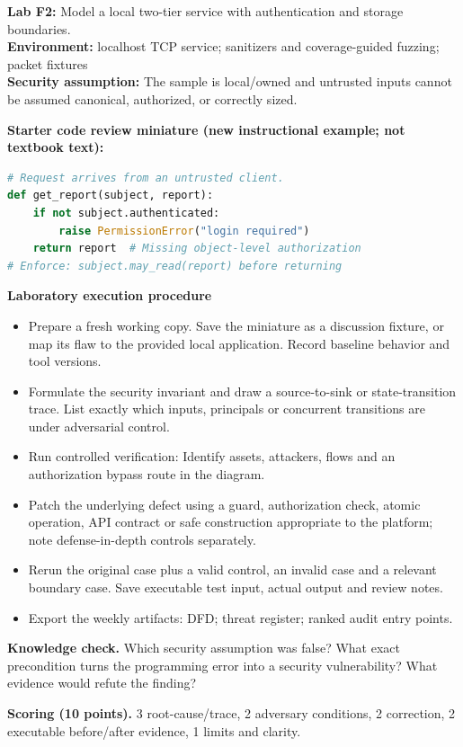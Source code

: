 \documentclass[10pt,letterpaper]{article}
\begin{document}
\begin{insight}\textbf{Lab F2:} Model a local two-tier service with authentication and storage boundaries.\\\textbf{Environment:} localhost TCP service; sanitizers and coverage-guided fuzzing; packet fixtures\\\textbf{Security assumption:} The sample is local/owned and untrusted inputs cannot be assumed canonical, authorized, or correctly sized.\end{insight}
\textbf{Starter code review miniature (new instructional example; not textbook text):}
\begin{lstlisting}[language=Python]
# Request arrives from an untrusted client.
def get_report(subject, report):
    if not subject.authenticated:
        raise PermissionError("login required")
    return report  # Missing object-level authorization
# Enforce: subject.may_read(report) before returning
\end{lstlisting}
\textbf{Laboratory execution procedure}
\begin{itemize}[leftmargin=*,itemsep=2pt]
\item Prepare a fresh working copy. Save the miniature as a discussion fixture, or map its flaw to the provided local application. Record baseline behavior and tool versions.
\item Formulate the security invariant and draw a source-to-sink or state-transition trace. List exactly which inputs, principals or concurrent transitions are under adversarial control.
\item Run controlled verification: Identify assets, attackers, flows and an authorization bypass route in the diagram.
\item Patch the underlying defect using a guard, authorization check, atomic operation, API contract or safe construction appropriate to the platform; note defense-in-depth controls separately.
\item Rerun the original case plus a valid control, an invalid case and a relevant boundary case. Save executable test input, actual output and review notes.
\item Export the weekly artifacts: DFD; threat register; ranked audit entry points.
\end{itemize}
\textbf{Knowledge check.} Which security assumption was false? What exact precondition turns the programming error into a security vulnerability? What evidence would refute the finding?

\textbf{Scoring (10 points).} 3 root-cause/trace, 2 adversary conditions, 2 correction, 2 executable before/after evidence, 1 limits and clarity.
\end{document}
